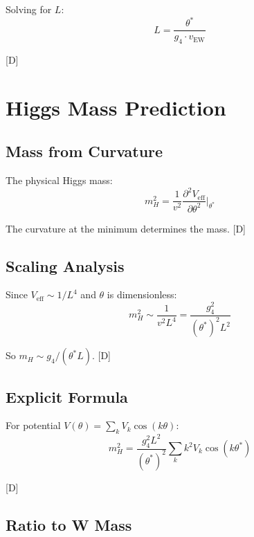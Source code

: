 \documentclass[11pt,a4paper]{article}
\newcommand{\tagD}{\textcolor{blue!70!black}{[D]}}
\begin{document}
Solving for $L$:
\begin{equation}
\label{eq:L-from-v}
L = \frac{\theta^*}{g_4 \cdot v_{\text{EW}}}
\end{equation}

\tagD

\section{Higgs Mass Prediction}

\subsection{Mass from Curvature}

The physical Higgs mass:
\begin{equation}
\label{eq:higgs-mass}
m_H^2 = \frac{1}{v^2} \frac{\partial^2 V_{\text{eff}}}{\partial \theta^2}\bigg|_{\theta^*}
\end{equation}

The curvature at the minimum determines the mass. \tagD

\subsection{Scaling Analysis}

Since $V_{\text{eff}} \sim 1/L^4$ and $\theta$ is dimensionless:
\begin{equation}
\label{eq:mH-scaling}
m_H^2 \sim \frac{1}{v^2 L^4} = \frac{g_4^2}{(\theta^*)^2 L^2}
\end{equation}

So $m_H \sim g_4/(\theta^* L)$. \tagD

\subsection{Explicit Formula}

For potential $V(\theta) = \sum_k V_k \cos(k\theta)$:
\begin{equation}
\label{eq:mH-explicit}
m_H^2 = \frac{g_4^2 L^2}{(\theta^*)^2} \sum_k k^2 V_k \cos(k\theta^*)
\end{equation}

\tagD

\subsection{Ratio to W Mass}
\end{document}
